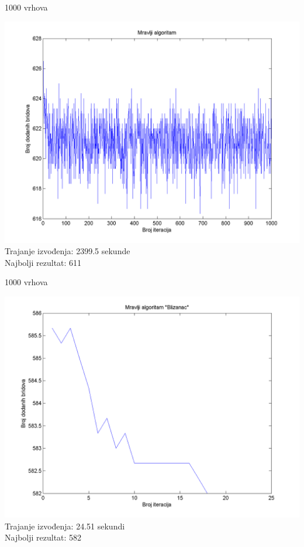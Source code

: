 \documentclass{beamer}
\begin{document}
\begin{frame}{1000 vrhova}
\begin{center}
\includegraphics[scale = 0.4]{Mr1000.png}\\
Trajanje izvođenja: 2399.5 sekunde\\
Najbolji rezultat: 611\\
\end{center}
\end{frame}

\begin{frame}{1000 vrhova}
\begin{center}
\includegraphics[scale = 0.4]{MrBl1000.png}\\
Trajanje izvođenja: 24.51 sekundi\\
Najbolji rezultat: 582\\
\end{center}
\end{frame}
\end{document}
